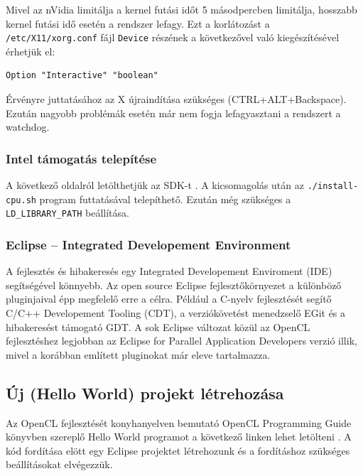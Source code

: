 	Mivel az nVidia limitálja a kernel futási időt 5 másodpercben limitálja,
	hosszabb kernel futási idő esetén a rendszer lefagy.
	Ezt a korlátozást a \texttt{/etc/X11/xorg.conf} fájl \texttt{Device} részének a
	következővel való kiegészítésével érhetjük el:
\begin{lstlisting}
Option "Interactive" "boolean"
\end{lstlisting}
	Érvényre juttatásához az X újraindítása szükséges (CTRL+ALT+Backspace).
	Ezután nagyobb problémák esetén már nem fogja lefagyasztani a rendszert a
	watchdog.

\subsubsection*{Intel támogatás telepítése}
	A következő oldalról letölthetjük az SDK-t \cite{intel-sdk}.
	A kicsomagolás után az \texttt{./install-cpu.sh} program futtatásával
	telepíthető.
	Ezután még szükséges a \texttt{LD\_LIBRARY\_PATH} beállítása.

\subsubsection*{Eclipse – Integrated Developement Environment}
	A fejlesztés és hibakeresés egy Integrated Developement Enviroment (IDE)
	segítségével könnyebb.
	Az open source Eclipse \cite{eclipse} fejlesztőkörnyezet a különböző pluginjaival épp
	megfelelő erre a célra.
	Például a C-nyelv fejlesztését segítő C/C++ Developement Tooling (CDT),
	a verziókövetést menedzselő EGit és a hibakeresést támogató GDT.
	A sok Eclipse változat közül az OpenCL fejlesztéshez legjobban az
	Eclipse for Parallel Application Developers verzió illik, mivel a korábban említett pluginokat már eleve tartalmazza.


\subsection*{Új (Hello World) projekt létrehozása}
	Az OpenCL fejlesztését konyhanyelven bemutató OpenCL Programming Guide \cite{Munshi2011}
	könyvben szereplő Hello World programot a következő linken lehet letölteni
	\cite{hellow}.
	A kód fordítása elött egy Eclipse projektet létrehozunk és a
	fordításhoz szükséges beállításokat elvégezzük.


